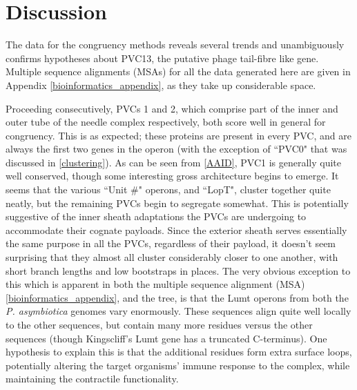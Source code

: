 \section{Discussion}
The data for the congruency methods reveals several trends and unambiguously confirms hypotheses about PVC13, the putative phage tail-fibre like gene. Multiple sequence alignments (MSAs) for all the data generated here are given in Appendix \vref{bioinformatics_appendix}, as they take up considerable space. 

Proceeding consecutively, PVCs 1 and 2, which comprise part of the inner and outer tube of the needle complex respectively, both score well in general for congruency. This is as expected; these proteins are present in every PVC, and are always the first two genes in the operon (with the exception of ``PVC0" that was discussed in \vref{clustering}). As can be seen from \vref{AAID}, PVC1 is generally quite well conserved, though some interesting gross architecture begins to emerge. It seems that the various ``Unit \#" operons, and ``LopT", cluster together quite neatly, but the remaining PVCs begin to segregate somewhat. This is potentially suggestive of the inner sheath adaptations the PVCs are undergoing to accommodate their cognate payloads. Since the exterior sheath serves essentially the same purpose in all the PVCs, regardless of their payload, it doesn't seem surprising that they almost all cluster considerably closer to one another, with short branch lengths and low bootstraps in places. The very obvious exception to this which is apparent in both the multiple sequence alignment (MSA) \vref{bioinformatics_appendix}, and the tree, is that the Lumt operons from both the \emph{P. asymbiotica} genomes vary enormously. These sequences align quite well locally to the other sequences, but contain many more residues versus the other sequences (though Kingscliff's Lumt gene has a truncated C-terminus). One hypothesis to explain this is that the additional residues form extra surface loops, potentially altering the target organisms' immune response to the complex, while maintaining the contractile functionality.

